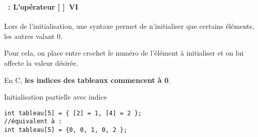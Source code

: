 \begin{frame}[containsverbatim]
  \frametitle{\secname}
  \framesubtitle{\subsecname~: L'opérateur [ ]~VI}

  Lors de l'initialisation, une syntaxe permet de n'initialiser que certains éléments, les autres valant 0.
  \vspace{0.3cm}
  \par
  Pour cela, on place entre crochet le numéro de l'élément à initialiser et on lui affecte la valeur désirée.
  \vspace{0.3cm}
  \par
  En C, \textbf{les indices des tableaux commencent à 0}.
  \begin{exampleblock}{Initialisation partielle avec indice}
    \begin{verbatim}
int tableau[5] = { [2] = 1, [4] = 2 };
//équivalent à :
int tableau[5] = {0, 0, 1, 0, 2 };\end{verbatim}
  \end{exampleblock}
\end{frame}

